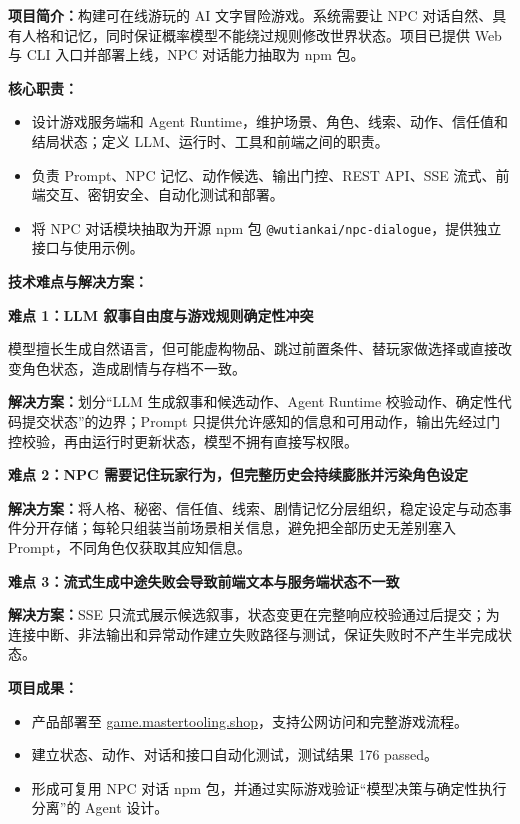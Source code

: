 

\textbf{项目简介：}构建可在线游玩的 AI 文字冒险游戏。系统需要让 NPC 对话自然、具有人格和记忆，同时保证概率模型不能绕过规则修改世界状态。项目已提供 Web 与 CLI 入口并部署上线，NPC 对话能力抽取为 npm 包。

\textbf{核心职责：}
\begin{itemize}[parsep=0.55ex]
  \item 设计游戏服务端和 Agent Runtime，维护场景、角色、线索、动作、信任值和结局状态；定义 LLM、运行时、工具和前端之间的职责。
  \item 负责 Prompt、NPC 记忆、动作候选、输出门控、REST API、SSE 流式、前端交互、密钥安全、自动化测试和部署。
  \item 将 NPC 对话模块抽取为开源 npm 包 \texttt{@wutiankai/npc-dialogue}，提供独立接口与使用示例。
\end{itemize}

\textbf{技术难点与解决方案：}

\textbf{难点 1：LLM 叙事自由度与游戏规则确定性冲突}

模型擅长生成自然语言，但可能虚构物品、跳过前置条件、替玩家做选择或直接改变角色状态，造成剧情与存档不一致。

\textbf{解决方案：}划分“LLM 生成叙事和候选动作、Agent Runtime 校验动作、确定性代码提交状态”的边界；Prompt 只提供允许感知的信息和可用动作，输出先经过门控校验，再由运行时更新状态，模型不拥有直接写权限。

\vspace{0.5ex}
\textbf{难点 2：NPC 需要记住玩家行为，但完整历史会持续膨胀并污染角色设定}

\textbf{解决方案：}将人格、秘密、信任值、线索、剧情记忆分层组织，稳定设定与动态事件分开存储；每轮只组装当前场景相关信息，避免把全部历史无差别塞入 Prompt，不同角色仅获取其应知信息。

\vspace{0.5ex}
\textbf{难点 3：流式生成中途失败会导致前端文本与服务端状态不一致}

\textbf{解决方案：}SSE 只流式展示候选叙事，状态变更在完整响应校验通过后提交；为连接中断、非法输出和异常动作建立失败路径与测试，保证失败时不产生半完成状态。

\pagebreak
\textbf{项目成果：}
\begin{itemize}[parsep=0.55ex]
  \item 产品部署至 \href{https://game.mastertooling.shop}{game.mastertooling.shop}，支持公网访问和完整游戏流程。
  \item 建立状态、动作、对话和接口自动化测试，测试结果 176 passed。
  \item 形成可复用 NPC 对话 npm 包，并通过实际游戏验证“模型决策与确定性执行分离”的 Agent 设计。
\end{itemize}

